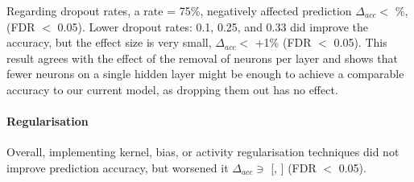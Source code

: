Regarding dropout rates, a rate = 75\%, negatively affected prediction  $\Delta_{acc} <$ \%, (FDR $<$ 0.05). Lower dropout rates: 0.1, 0.25, and 0.33 did improve the accuracy, but the effect size is very small, $\Delta_{acc} <$ +1\% (FDR $<$ 0.05). This result agrees with the effect of the removal of neurons per layer and shows that fewer neurons on a single hidden layer might be enough to achieve a comparable accuracy to our current model, as dropping them out has no effect.

\paragraph{Regularisation}

Overall, implementing kernel, bias, or activity regularisation techniques did not improve prediction accuracy, but worsened it $\Delta_{acc} \ni$ [, ] (FDR $<$ 0.05).

\vspace{+19pt} %

